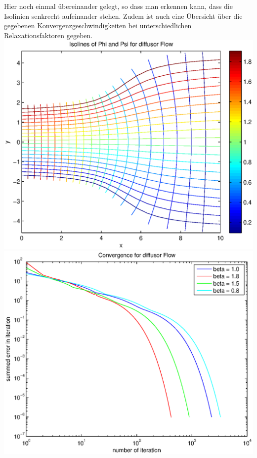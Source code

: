 \documentclass{article}
\begin{document}
Hier noch einmal übereinander gelegt, so dass man erkennen kann, dass die Isolinien senkrecht aufeinander stehen. Zudem
ist auch eine Übersicht über die gegebenen Konvergenzgeschwindigkeiten bei unterschiedlichen Relaxationsfaktoren gegeben.\\
\includegraphics[scale=0.4]{test/3diffusor/both.eps}
\includegraphics[scale=0.4]{test/3diffusor/error.eps}
\end{document}
